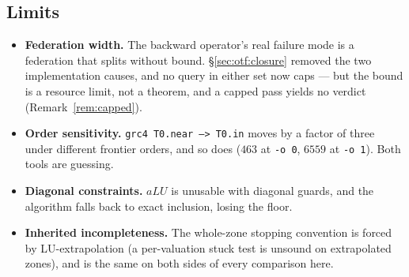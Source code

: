\subsection{Limits}

\begin{itemize}
  \item \textbf{Federation width.} The backward operator's real failure mode is a federation that
        splits without bound. \S\ref{sec:otf:closure} removed the two implementation causes, and no
        query in either set now caps --- but the bound is a resource limit, not a theorem, and a
        capped pass yields no verdict (Remark~\ref{rem:capped}).
  \item \textbf{Order sensitivity.} \texttt{grc4 T0.near --> T0.in} moves by a factor of three
        under different frontier orders, and so does \verifyta{} ($463$ at \texttt{-o 0}, $6559$ at
        \texttt{-o 1}). Both tools are guessing.
  \item \textbf{Diagonal constraints.} $aLU$ is unusable with diagonal guards, and the algorithm
        falls back to exact inclusion, losing the floor.
  \item \textbf{Inherited incompleteness.} The whole-zone stopping convention is forced by
        LU-extrapolation (a per-valuation stuck test is unsound on extrapolated zones), and is the
        same on both sides of every comparison here.
\end{itemize}

